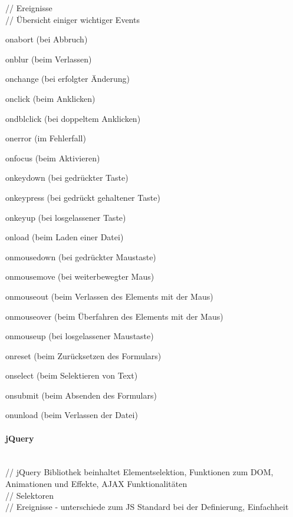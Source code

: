\documentclass[12pt,a4paper,bibliography=totocnumbered,listof=totocnumbered]{scrartcl}
\begin{document}
// Ereignisse\\
// Übersicht einiger wichtiger Events
    \begin{compactitem}
	    \item onabort (bei Abbruch)
	    \item onblur (beim Verlassen)
	    \item onchange (bei erfolgter Änderung)
	    \item onclick (beim Anklicken)
	    \item ondblclick (bei doppeltem Anklicken)
	    \item onerror (im Fehlerfall)
	    \item onfocus (beim Aktivieren)
	    \item onkeydown (bei gedrückter Taste)
	    \item onkeypress (bei gedrückt gehaltener Taste)
	    \item onkeyup (bei losgelassener Taste)
	    \item onload (beim Laden einer Datei)
	    \item onmousedown (bei gedrückter Maustaste)
	    \item onmousemove (bei weiterbewegter Maus)
	    \item onmouseout (beim Verlassen des Elements mit der Maus)
	    \item onmouseover (beim Überfahren des Elements mit der Maus)
	    \item onmouseup (bei losgelassener Maustaste)
	    \item onreset (beim Zurücksetzen des Formulars)
	    \item onselect (beim Selektieren von Text)
	    \item onsubmit (beim Absenden des Formulars)
	    \item onunload (beim Verlassen der Datei)
    \end{compactitem}

\paragraph{jQuery}
$\;$ \\
// jQuery Bibliothek beinhaltet Elementselektion, Funktionen zum DOM, Animationen und Effekte, AJAX Funktionalitäten\\

// Selektoren\\

// Ereignisse - unterschiede zum JS Standard bei der Definierung, Einfachheit\\
\end{document}
